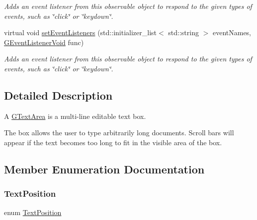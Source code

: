 \begin{DoxyCompactItemize}
\begin{DoxyCompactList}\small\item\em Adds an event listener from this observable object to respond to the given types of events, such as \char`\"{}click\char`\"{} or \char`\"{}keydown\char`\"{}. \end{DoxyCompactList}\item 
virtual void \mbox{\hyperlink{classsgl_1_1GObservable_a7867184bbb686f74fae8a4db927da799}{set\+Event\+Listeners}} (std\+::initializer\+\_\+list$<$ std\+::string $>$ event\+Names, \mbox{\hyperlink{namespacesgl_a54427ce97bb1c2804e4fe2b0a62e8b17}{G\+Event\+Listener\+Void}} func)
\begin{DoxyCompactList}\small\item\em Adds an event listener from this observable object to respond to the given types of events, such as \char`\"{}click\char`\"{} or \char`\"{}keydown\char`\"{}. \end{DoxyCompactList}\end{DoxyCompactItemize}


\subsection{Detailed Description}
A \mbox{\hyperlink{classsgl_1_1GTextArea}{G\+Text\+Area}} is a multi-\/line editable text box. 

The box allows the user to type arbitrarily long documents. Scroll bars will appear if the text becomes too long to fit in the visible area of the box. 

\subsection{Member Enumeration Documentation}
\mbox{\label{classsgl_1_1GInteractor_a8e0d441725a81d2bbdebbea09078260e}} 
\subsubsection{\texorpdfstring{Text\+Position}{TextPosition}}
{\footnotesize\ttfamily enum \mbox{\hyperlink{classsgl_1_1GInteractor_a8e0d441725a81d2bbdebbea09078260e}{Text\+Position}}\hspace{0.3cm}{\ttfamily [inherited]}}



